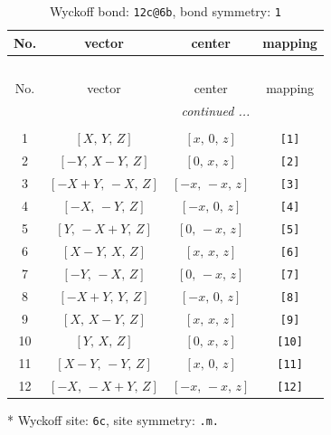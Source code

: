 \documentclass[fleqn,8pt]{jsarticle}
\begin{document}
\begin{longtable}{cccc}
\caption{Wyckoff bond: {\tt 12c@6b}, bond symmetry: {\tt 1}}
 \\
 \hline \hline
No. & vector & center & mapping \\ \hline \endfirsthead

\multicolumn{3}{l}{\tablename\ \thetable{}} \\
 \hline \hline
No. & vector & center & mapping \\ \hline \endhead

 \hline \hline
\multicolumn{3}{r}{\footnotesize\it continued ...} \\ \endfoot

 \hline \hline
\multicolumn{3}{r}{} \\ \endlastfoot

1 & $\left[ X,\, Y,\, Z \right]$ & $\left[ x,\, 0,\, z \right]$ & {\tt [1]} \\ \hline
2 & $\left[ - Y,\, X - Y,\, Z \right]$ & $\left[ 0,\, x,\, z \right]$ & {\tt [2]} \\ \hline
3 & $\left[ - X + Y,\, - X,\, Z \right]$ & $\left[ - x,\, - x,\, z \right]$ & {\tt [3]} \\ \hline
4 & $\left[ - X,\, - Y,\, Z \right]$ & $\left[ - x,\, 0,\, z \right]$ & {\tt [4]} \\ \hline
5 & $\left[ Y,\, - X + Y,\, Z \right]$ & $\left[ 0,\, - x,\, z \right]$ & {\tt [5]} \\ \hline
6 & $\left[ X - Y,\, X,\, Z \right]$ & $\left[ x,\, x,\, z \right]$ & {\tt [6]} \\ \hline
7 & $\left[ - Y,\, - X,\, Z \right]$ & $\left[ 0,\, - x,\, z \right]$ & {\tt [7]} \\ \hline
8 & $\left[ - X + Y,\, Y,\, Z \right]$ & $\left[ - x,\, 0,\, z \right]$ & {\tt [8]} \\ \hline
9 & $\left[ X,\, X - Y,\, Z \right]$ & $\left[ x,\, x,\, z \right]$ & {\tt [9]} \\ \hline
10 & $\left[ Y,\, X,\, Z \right]$ & $\left[ 0,\, x,\, z \right]$ & {\tt [10]} \\ \hline
11 & $\left[ X - Y,\, - Y,\, Z \right]$ & $\left[ x,\, 0,\, z \right]$ & {\tt [11]} \\ \hline
12 & $\left[ - X,\, - X + Y,\, Z \right]$ & $\left[ - x,\, - x,\, z \right]$ & {\tt [12]} \\
\end{longtable}
* Wyckoff site: {\tt 6c}, site symmetry: {\tt .m.}
\renewcommand{\arraystretch}{1.2}
\end{document}
